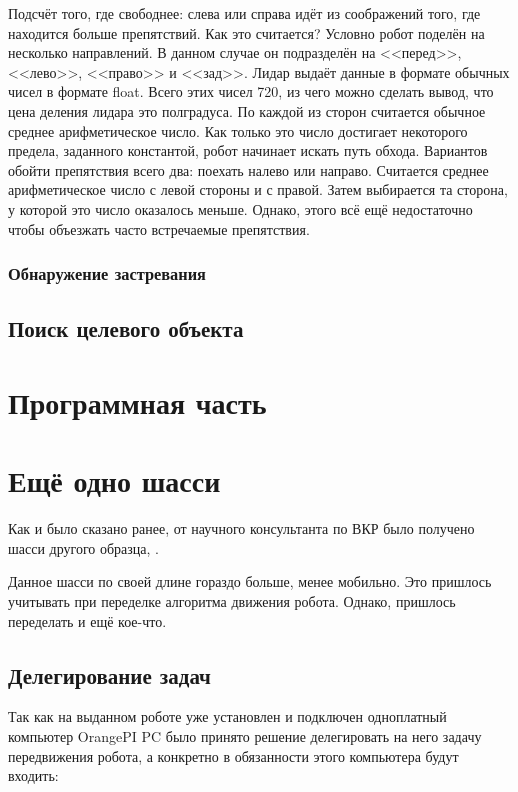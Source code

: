 Подсчёт того, где свободнее: слева или справа идёт из соображений того, где находится больше препятствий. Как это считается? Условно робот поделён на несколько направлений. В данном случае он подразделён на <<перед>>, <<лево>>, <<право>> и <<зад>>. Лидар выдаёт данные в формате обычных чисел в формате float. Всего этих чисел 720, из чего можно сделать вывод, что цена деления лидара это полградуса. По каждой из сторон считается обычное среднее арифметическое число. Как только это число достигает некоторого предела, заданного константой, робот начинает искать путь обхода. Вариантов обойти препятствия всего два: поехать налево или направо. Считается среднее арифметическое число с левой стороны и с правой. Затем выбирается та сторона, у которой это число оказалось меньше. Однако, этого всё ещё недостаточно чтобы объезжать часто встречаемые препятствия. 

\subsubsection{Обнаружение застревания}

\subsection{Поиск целевого объекта}

\section{Программная часть}

\section{Ещё одно шасси}
Как и было сказано ранее, от научного консультанта по ВКР было получено шасси другого образца, .

Данное шасси по своей длине гораздо больше, менее мобильно. Это пришлось учитывать при переделке алгоритма движения робота. Однако, пришлось переделать и ещё кое-что.

\subsection{Делегирование задач}

Так как на выданном роботе уже установлен и подключен одноплатный компьютер OrangePI PC было принято решение делегировать на него задачу передвижения робота, а конкретно в обязанности этого компьютера будут входить:

